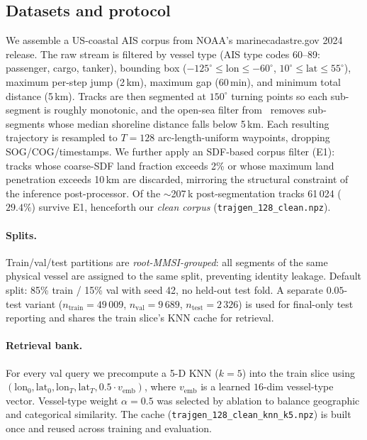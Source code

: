\documentclass[11pt]{article}
\begin{document}
\subsection{Datasets and protocol}
\label{sec:datasets}

We assemble a US-coastal AIS corpus from NOAA's
marinecadastre.gov 2024 release. The raw stream is filtered by vessel type
(AIS type codes 60--89: passenger, cargo, tanker), bounding box
($-125^\circ \le \mathrm{lon} \le -60^\circ$,
$10^\circ \le \mathrm{lat} \le 55^\circ$), maximum per-step jump
(2\,km), maximum gap (60\,min), and minimum total distance (5\,km). Tracks
are then segmented at $150^\circ$ turning points so each sub-segment is
roughly monotonic, and the open-sea filter from~\citep{wessel1996gshhs} removes
sub-segments whose median shoreline distance falls below 5\,km. Each
resulting trajectory is resampled to $T = 128$ arc-length-uniform
waypoints, dropping SOG/COG/timestamps. We further apply an
SDF-based corpus filter (E1): tracks whose coarse-SDF land fraction
exceeds 2\% or whose maximum land penetration exceeds 10\,km are
discarded, mirroring the structural constraint of the inference
post-processor. Of the $\sim$207\,k post-segmentation tracks 61\,024
($29.4\%$) survive E1, henceforth our \textit{clean corpus}
(\texttt{trajgen\_128\_clean.npz}).

\paragraph{Splits.} Train/val/test partitions are
\emph{root-MMSI-grouped}: all segments of the same physical vessel are
assigned to the same split, preventing identity leakage. Default split:
85\% train / 15\% val with seed 42, no held-out test fold. A separate
$0.05$-test variant ($n_{\text{train}}=49\,009$, $n_{\text{val}}=9\,689$,
$n_{\text{test}}=2\,326$) is used for final-only test reporting and
shares the train slice's KNN cache for retrieval.

\paragraph{Retrieval bank.} For every val query we precompute a 5-D KNN
($k=5$) into the train slice using
$(\text{lon}_0, \text{lat}_0, \text{lon}_T, \text{lat}_T,
0.5 \cdot v_{\text{emb}})$, where $v_{\text{emb}}$ is a learned
$16$-dim vessel-type vector. Vessel-type weight $\alpha=0.5$ was selected
by ablation to balance geographic and categorical similarity. The cache
(\texttt{trajgen\_128\_clean\_knn\_k5.npz}) is built once and reused
across training and evaluation.
\end{document}
